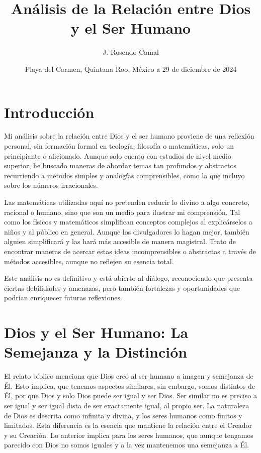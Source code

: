 \documentclass[letterpaper,13pt]{article}
\title{Análisis de la Relación entre Dios y el Ser Humano} %
\author{J. Rosendo Camal} %
\date{Playa del Carmen, Quintana Roo, México a 29 de diciembre de 2024} %
\begin{document}
\maketitle  %

\section{Introducción}

Mi análisis sobre la relación entre Dios y el ser humano proviene de una reflexión personal, sin formación formal en teología, filosofía o matemáticas, solo un principiante o aficionado. Aunque solo cuento con estudios de nivel medio superior, he buscado maneras de abordar temas tan profundos y abstractos recurriendo a métodos simples y analogías comprensibles, como la que incluyo sobre los números irracionales.

Las matemáticas utilizadas aquí no pretenden reducir lo divino a algo concreto, racional o humano, sino que son un medio para ilustrar mi comprensión. Tal como los físicos y matemáticos simplifican conceptos complejos al explicárselos a niños y al público en general. Aunque los divulgadores lo hagan mejor, también alguien simplificará y las hará más accesible de manera magistral. Trato de encontrar maneras de acercar estas ideas incomprensibles o abstractas a través de métodos accesibles, aunque no reflejen su esencia total.

Este análisis no es definitivo y está abierto al diálogo, reconociendo que presenta ciertas debilidades y amenazas, pero también fortalezas y oportunidades que podrían enriquecer futuras reflexiones.

\section{Dios y el Ser Humano: La Semejanza y la Distinción}

El relato bíblico menciona que Dios creó al ser humano a imagen y semejanza de Él. Esto implica, que tenemos aspectos similares, sin embargo, somos distintos de Él, por que Dios y solo Dios puede ser igual y ser Dios. Ser similar no es preciso a ser igual y ser igual dista de ser exactamente igual, al propio ser. La naturaleza de Dios es descrita como infinita y divina, y los seres humanos como finitos y limitados. Esta diferencia es la esencia que mantiene la relación entre el Creador y su Creación. Lo anterior implica para los seres humanos, que aunque tengamos parecido con Dios no somos iguales y a la vez mantenemos una semejanza a Él.
\end{document}
